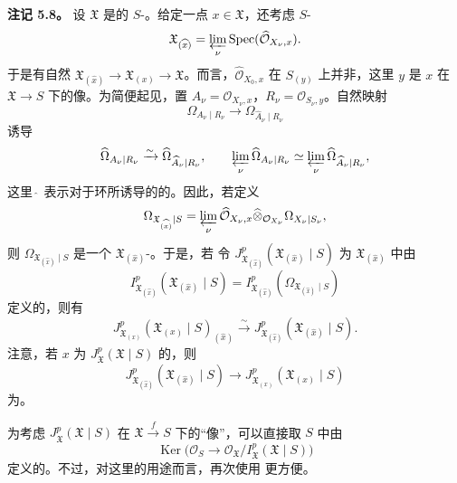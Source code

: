 \textbf{注记 5.8。} 设 $\mathfrak X$ 是的 $S$-。给定一点 $x\in\mathfrak X$，还考虑 $S$-
\[
\mathfrak X_{(\widehat x)}=\varprojlim_\nu\operatorname{Spec}(\widehat{\mathcal O}_{X_\nu,x}).
\]
于是有自然 $\mathfrak X_{(\widehat x)}\to\mathfrak X_{(x)}\to\mathfrak X$。而言，$\widehat{\mathcal O}_{X_0,x}$ 在 $S_{(y)}$ 上并非，这里 $y$ 是 $x$ 在 $\mathfrak X\to S$ 下的像。为简便起见，置 $A_\nu=\mathcal O_{X_\nu,x}$，$R_\nu=\mathcal O_{S_\nu,y}$。自然映射
\[
\Omega_{A_\nu\mid R_\nu}\longrightarrow\Omega_{\widehat A_\nu\mid R_\nu}
\]
诱导
\[
\widehat\Omega_{A_\nu\mid R_\nu}\xrightarrow\sim\widehat\Omega_{\widehat A_\nu\mid R_\nu},
\qquad
\varprojlim_\nu\widehat\Omega_{A_\nu\mid R_\nu}\simeq
\varprojlim_\nu\widehat\Omega_{\widehat A_\nu\mid R_\nu},
\]
这里 $\widehat{\ }$ 表示对于环所诱导的的。因此，若定义
\[
\Omega_{\mathfrak X_{(\widehat x)}\mid S}
 =\varprojlim_\nu\widehat{\mathcal O}_{X_\nu,x}
 \widehat\otimes_{\mathcal O_{X_\nu}}\Omega_{X_\nu\mid S_\nu},
\]
则 $\Omega_{\mathfrak X_{(\widehat x)}\mid S}$ 是一个 $\mathfrak X_{(\widehat x)}$-。于是，若
令 $J_{\mathfrak X_{(\widehat x)}}^p(\mathfrak X_{(\widehat x)}\mid S)$ 为 $\mathfrak X_{(\widehat x)}$ 中由
\[
I_{\mathfrak X_{(\widehat x)}}^p(\mathfrak X_{(\widehat x)}\mid S)
 =I_{\mathfrak X_{(\widehat x)}}^p(\Omega_{\mathfrak X_{(\widehat x)}\mid S})
\]
定义的，则有
\[
J_{\mathfrak X_{(x)}}^p(\mathfrak X_{(x)}\mid S)_{(\widehat x)}
 \xrightarrow\sim J_{\mathfrak X_{(\widehat x)}}^p(\mathfrak X_{(\widehat x)}\mid S).
\]
注意，若 $x$ 为 $J_{\mathfrak X}^p(\mathfrak X\mid S)$ 的，则
\[
J_{\mathfrak X_{(\widehat x)}}^p(\mathfrak X_{(\widehat x)}\mid S)
 \longrightarrow J_{\mathfrak X_{(x)}}^p(\mathfrak X_{(x)}\mid S)
\]
为。

为考虑 $J_{\mathfrak X}^p(\mathfrak X\mid S)$ 在 $\mathfrak X\xrightarrow fS$ 下的“像”，可以直接取 $S$ 中由
\[
\operatorname{Ker}\bigl(\mathcal O_S\longrightarrow
 \mathcal O_{\mathfrak X}/I_{\mathfrak X}^p(\mathfrak X\mid S)\bigr)
\]
定义的。不过，对这里的用途而言，再次使用 更方便。

